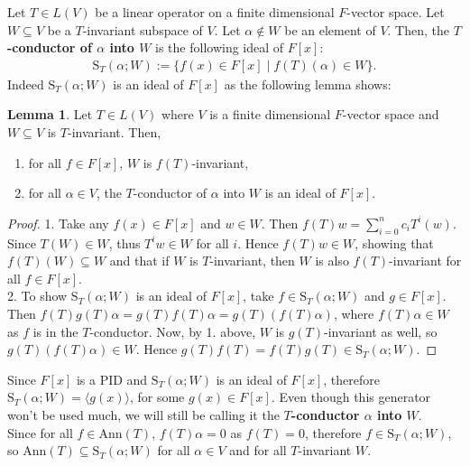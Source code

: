 \documentclass[letterpaper,11pt,twoside]{article}
\theoremstyle{definition}
\theoremstyle{definition}
\theoremstyle{definition}
\theoremstyle{definition}
\newtheorem{lemma}[proposition]{\textbf{Lemma}}
\theoremstyle{definition}
\theoremstyle{definition}
\theoremstyle{remark}
\theoremstyle{definition}
\newcommand{\Ann}[1]{\text{Ann}\left(#1\right)}
\newcommand{\gen}[1]{\langle #1\rangle}
\newcommand{\cond}[3]{\text{S}_{#1}\left(#2;#3\right)}
\begin{document}
    Let $T\in L(V)$ be a linear operator on a finite dimensional $F$-vector space. Let $W\subseteq V$ be a $T$-invariant subspace of $V$. Let $\alpha \notin W$ be an element of $V$. Then, the \textbf{$T$-conductor of $\alpha$ into $W$ }is the following ideal of $F[x]$:
    \begin{align*}
        \cond{T}{\alpha}{W} := \{f(x)\in F[x]\;\vert\; f(T)(\alpha)\in W\}.
    \end{align*}
    Indeed $\cond{T}{\alpha}{W}$ is an ideal of $F[x]$ as the following lemma shows:
    \begin{lemma}\label{L-2.3.1}
    Let $T\in L(V)$ where $V$ is a finite dimensional $F$-vector space and $W\subseteq V$ is $T$-invariant. Then,
    \begin{enumerate}
        \item {for all $f\in F[x]$, $W$ is $f(T)$-invariant,}
        \item {for all $\alpha \in V$, the $T$-conductor of $\alpha$ into $W$ is an ideal of $F[x]$.}
    \end{enumerate}
    \end{lemma}
    \begin{proof}
    1. Take any $f(x) \in F[x]$ and $w\in W$. Then $f(T)w = \sum_{i=0}^n c_iT^i(w)$. Since $T(W) \in W$, thus $T^iw \in W$ for all $i$. Hence $f(T)w \in W$, showing that $f(T)(W) \subseteq W$ and that if $W$ is $T$-invariant, then $W$ is also $f(T)$-invariant for all $f\in F[x]$.\\
    
    2. To show $\cond{T}{\alpha}{W}$ is an ideal of $F[x]$, take $f\in \cond{T}{\alpha}{W}$ and $g\in F[x]$. Then $f(T)g(T)\alpha = g(T) f(T) \alpha= g(T)(f(T)\alpha)$, where $f(T)\alpha \in W$ as $f$ is in the $T$-conductor. Now, by 1. above, $W$ is $g(T)$-invariant as well, so $g(T)(f(T)\alpha) \in W$. Hence $g(T)f(T) = f(T)g(T) \in \cond{T}{\alpha}{W}$. 
    \end{proof} 
    Since $F[x]$ is a PID and $\cond{T}{\alpha}{W}$ is an ideal of $F[x]$, therefore $\cond{T}{\alpha}{W} = \gen{g(x)}$, for some $g(x) \in F[x]$. Even though this generator won't be used much, we will still be calling it the \textbf{$T$-conductor $\alpha$ into $W$}. \\
    
    Since for all $f\in \Ann{T}$, $f(T)\alpha = 0$ as $f(T) = 0$, therefore $f\in \cond{T}{\alpha}{W}$, so $\Ann{T} \subseteq \cond{T}{\alpha}{W}$ for all $\alpha\in V$ and for all $T$-invariant $W$.\\
    
\end{document}
